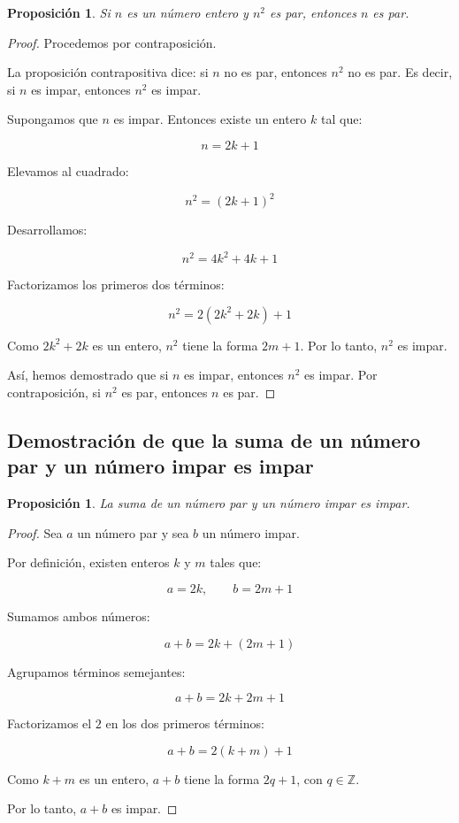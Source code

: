 \documentclass[12pt,final]{report}
\theoremstyle{plain}
\newtheorem{proposition}[theorem]{Proposición}
\theoremstyle{definition}
\begin{document}
\begin{proposition}
Si $n$ es un número entero y $n^2$ es par, entonces $n$ es par.
\end{proposition}

\begin{proof}

Procedemos por contraposición.

La proposición contrapositiva dice: si $n$ no es par, entonces $n^2$ no es par. Es decir, si $n$ es impar, entonces $n^2$ es impar.

Supongamos que $n$ es impar. Entonces existe un entero $k$ tal que:

\[
n = 2k+1
\]

Elevamos al cuadrado:

\[
n^2 = (2k+1)^2
\]

Desarrollamos:

\[
n^2 = 4k^2 + 4k + 1
\]

Factorizamos los primeros dos términos:

\[
n^2 = 2(2k^2+2k)+1
\]

Como $2k^2+2k$ es un entero, $n^2$ tiene la forma $2m+1$. Por lo tanto, $n^2$ es impar.

Así, hemos demostrado que si $n$ es impar, entonces $n^2$ es impar. Por contraposición, si $n^2$ es par, entonces $n$ es par.

\end{proof}

\newpage

\subsection{Demostración de que la suma de un número par y un número impar es impar}

\begin{proposition}
La suma de un número par y un número impar es impar.
\end{proposition}

\begin{proof}

Sea $a$ un número par y sea $b$ un número impar.

Por definición, existen enteros $k$ y $m$ tales que:

\[
a = 2k, \qquad b = 2m+1
\]

Sumamos ambos números:

\[
a+b = 2k + (2m+1)
\]

Agrupamos términos semejantes:

\[
a+b = 2k + 2m + 1
\]

Factorizamos el $2$ en los dos primeros términos:

\[
a+b = 2(k+m)+1
\]

Como $k+m$ es un entero, $a+b$ tiene la forma $2q+1$, con $q \in \mathbb{Z}$.

Por lo tanto, $a+b$ es impar.

\end{proof}
\end{document}
